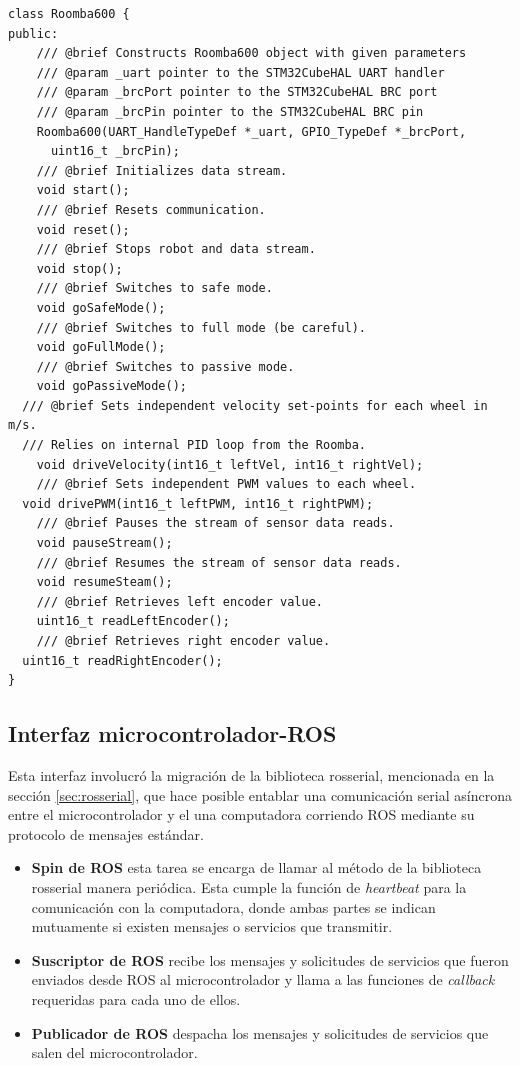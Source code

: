 \begin{lstlisting}[label=cod:Roomba600,caption=Interfaz de la clase Roomba600 que implementa el protocolo Open Interface.\protect\footnotemark]
class Roomba600 {
public:
	/// @brief Constructs Roomba600 object with given parameters
	/// @param _uart pointer to the STM32CubeHAL UART handler
	/// @param _brcPort pointer to the STM32CubeHAL BRC port
	/// @param _brcPin pointer to the STM32CubeHAL BRC pin
	Roomba600(UART_HandleTypeDef *_uart, GPIO_TypeDef *_brcPort,
      uint16_t _brcPin);
	/// @brief Initializes data stream.
	void start();
	/// @brief Resets communication.
	void reset();
	/// @brief Stops robot and data stream.
	void stop();
	/// @brief Switches to safe mode.
	void goSafeMode();
	/// @brief Switches to full mode (be careful).
	void goFullMode();
	/// @brief Switches to passive mode.
	void goPassiveMode();
  /// @brief Sets independent velocity set-points for each wheel in m/s.
  /// Relies on internal PID loop from the Roomba.
	void driveVelocity(int16_t leftVel, int16_t rightVel);
	/// @brief Sets independent PWM values to each wheel.
  void drivePWM(int16_t leftPWM, int16_t rightPWM);
	/// @brief Pauses the stream of sensor data reads.
	void pauseStream();
	/// @brief Resumes the stream of sensor data reads.
	void resumeSteam();
	/// @brief Retrieves left encoder value.
	uint16_t readLeftEncoder();
	/// @brief Retrieves right encoder value.
  uint16_t readRightEncoder();
}
\end{lstlisting}


\subsection{Interfaz microcontrolador-ROS}

Esta interfaz involucró la migración de la biblioteca rosserial, mencionada en la sección \ref{sec:rosserial}, que hace posible entablar una comunicación serial asíncrona entre el microcontrolador y el una computadora corriendo ROS mediante su protocolo de mensajes estándar.

\begin{itemize}
  \item \textbf{Spin de ROS} esta tarea se encarga de llamar al método  de la biblioteca rosserial manera periódica. Esta cumple la función de \textit{heartbeat} para la comunicación con la computadora, donde ambas partes se indican mutuamente si existen mensajes o servicios que transmitir.
  \item \textbf{Suscriptor de ROS} recibe los mensajes y solicitudes de servicios que fueron enviados desde ROS al microcontrolador y llama a las funciones de \textit{callback} requeridas para cada uno de ellos.
  \item \textbf{Publicador de ROS} despacha los mensajes y solicitudes de servicios que salen del microcontrolador.
\end{itemize}

